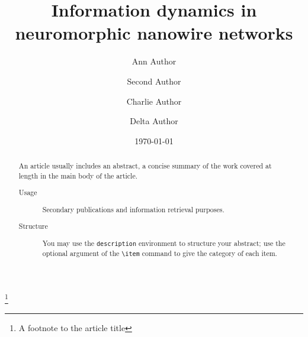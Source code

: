 \documentclass[%
 reprint,
 amsmath,amssymb,
 aps,
floatfix,
]{revtex4-2}
\begin{document}

\title{Information dynamics in neuromorphic nanowire networks}%
\thanks{A footnote to the article title}%

\author{Ann Author}
\author{Second Author}%
%


\author{Charlie Author}
%
%
\author{Delta Author}
%


\date{\today}%

\begin{abstract}
An article usually includes an abstract, a concise summary of the work
covered at length in the main body of the article. 
\begin{description}
\item[Usage]
Secondary publications and information retrieval purposes.
\item[Structure]
You may use the \texttt{description} environment to structure your abstract;
use the optional argument of the \verb+\item+ command to give the category of each item. 
\end{description}
\end{abstract}

\maketitle
\end{document}
